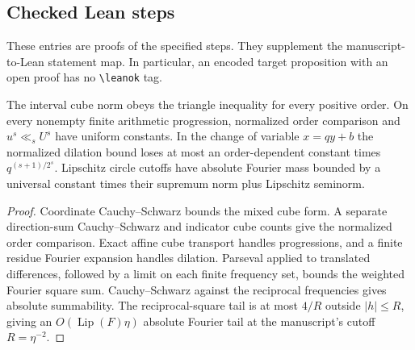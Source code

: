 
\subsection{Checked Lean steps}

These entries are proofs of the specified steps. They supplement
the manuscript-to-Lean statement map. In particular, an encoded
target proposition with an open proof has no \verb|\leanok| tag.

\begin{lemma}\label{checked-norm-foundations}
\leanok
The interval cube norm obeys the triangle inequality for every positive
order. On every nonempty finite arithmetic progression, normalized
order comparison and $u^s\ll_s U^s$ have uniform constants. In the
change of variable $x=qy+b$ the normalized dilation bound loses at
most an order-dependent constant times $q^{(s+1)/2^s}$. Lipschitz
circle cutoffs have absolute Fourier mass bounded by a universal
constant times their supremum norm plus Lipschitz seminorm.
\end{lemma}
\begin{proof}
\leanok
Coordinate Cauchy--Schwarz bounds the mixed cube form. A separate
direction-sum Cauchy--Schwarz and indicator cube counts give the
normalized order comparison. Exact affine cube transport handles
progressions, and a finite residue Fourier expansion handles dilation.
Parseval applied to translated differences, followed by a limit on
each finite frequency set, bounds the weighted Fourier square sum.
Cauchy--Schwarz against the reciprocal frequencies gives absolute
summability. The reciprocal-square tail is at most $4/R$ outside
$|h|\le R$, giving an $O(\operatorname{Lip}(F)\eta)$ absolute
Fourier tail at the manuscript's cutoff $R=\eta^{-2}$.
\end{proof}

